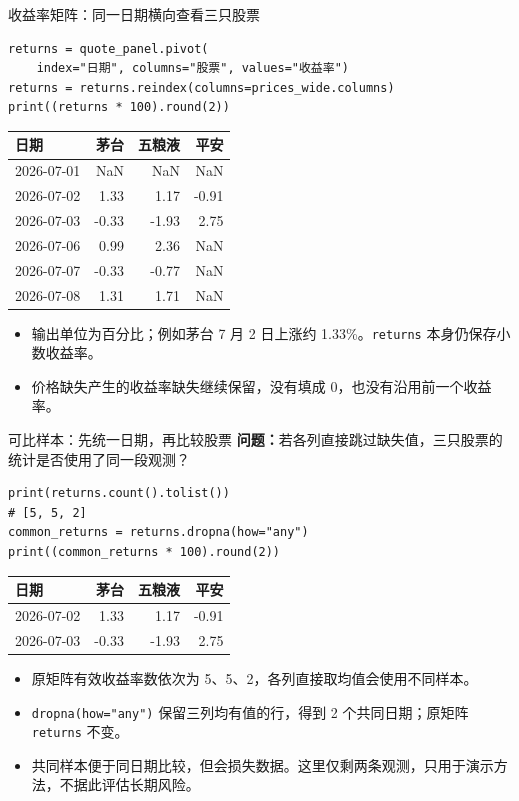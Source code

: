 \documentclass[9pt]{ctexbeamer}
\begin{document}
\begin{frame}[fragile]{收益率矩阵：同一日期横向查看三只股票}
\begin{lstlisting}[basicstyle=\ttfamily\scriptsize]
returns = quote_panel.pivot(
    index="日期", columns="股票", values="收益率")
returns = returns.reindex(columns=prices_wide.columns)
print((returns * 100).round(2))
\end{lstlisting}
\begin{center}
\small
\begin{tabular}{lrrr}
\toprule
日期 & 茅台 & 五粮液 & 平安 \\
\midrule
2026-07-01 & NaN & NaN & NaN \\
2026-07-02 & 1.33 & 1.17 & -0.91 \\
2026-07-03 & -0.33 & -1.93 & 2.75 \\
2026-07-06 & 0.99 & 2.36 & NaN \\
2026-07-07 & -0.33 & -0.77 & NaN \\
2026-07-08 & 1.31 & 1.71 & NaN \\
\bottomrule
\end{tabular}
\end{center}
\begin{itemize}
\item 输出单位为百分比；例如茅台 7 月 2 日上涨约 1.33\%。\texttt{returns} 本身仍保存小数收益率。
\item 价格缺失产生的收益率缺失继续保留，没有填成 0，也没有沿用前一个收益率。
\end{itemize}
\end{frame}

\begin{frame}[fragile]{可比样本：先统一日期，再比较股票}
\small \textbf{问题：}若各列直接跳过缺失值，三只股票的统计是否使用了同一段观测？
\begin{lstlisting}
print(returns.count().tolist())
# [5, 5, 2]
common_returns = returns.dropna(how="any")
print((common_returns * 100).round(2))
\end{lstlisting}
\begin{center}
\begin{tabular}{lrrr}
\toprule
日期 & 茅台 & 五粮液 & 平安 \\
\midrule
2026-07-02 & 1.33 & 1.17 & -0.91 \\
2026-07-03 & -0.33 & -1.93 & 2.75 \\
\bottomrule
\end{tabular}
\end{center}
\begin{itemize}
\item 原矩阵有效收益率数依次为 5、5、2，各列直接取均值会使用不同样本。
\item \texttt{dropna(how="any")} 保留三列均有值的行，得到 2 个共同日期；原矩阵 \texttt{returns} 不变。
\item 共同样本便于同日期比较，但会损失数据。这里仅剩两条观测，只用于演示方法，不据此评估长期风险。
\end{itemize}
\end{frame}
\end{document}
